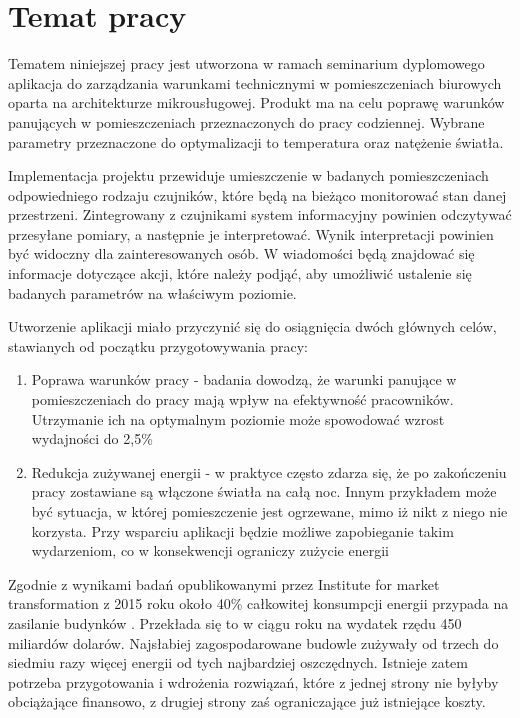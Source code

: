 \newpage %
\section{Temat pracy}

Tematem niniejszej pracy jest utworzona w ramach seminarium dyplomowego aplikacja do 
zarządzania warunkami technicznymi w pomieszczeniach biurowych oparta na architekturze 
mikrousługowej. Produkt ma na celu poprawę warunków panujących w pomieszczeniach 
przeznaczonych do pracy codziennej. Wybrane parametry przeznaczone do optymalizacji to 
temperatura oraz natężenie światła.

Implementacja projektu przewiduje umieszczenie w badanych pomieszczeniach odpowiedniego 
rodzaju czujników, które będą na bieżąco monitorować stan danej przestrzeni. 
Zintegrowany z czujnikami system informacyjny powinien odczytywać przesyłane 
pomiary, a następnie je interpretować. Wynik interpretacji powinien być widoczny dla 
zainteresowanych osób. W wiadomości będą znajdować się informacje dotyczące 
akcji, które należy podjąć, aby umożliwić ustalenie się badanych parametrów na 
właściwym poziomie.

Utworzenie aplikacji miało przyczynić się do osiągnięcia dwóch głównych 
celów, stawianych od początku przygotowywania pracy:

\begin{enumerate}
    \item Poprawa warunków pracy - badania \cite{oseland2012} dowodzą, że 
    warunki panujące w pomieszczeniach do pracy mają wpływ na efektywność pracowników. 
    Utrzymanie ich na optymalnym poziomie może spowodować wzrost wydajności do 2,5\%
    \item Redukcja zużywanej energii - w praktyce często zdarza się, że po zakończeniu 
    pracy zostawiane są włączone światła na całą noc. Innym przykładem może być 
    sytuacja, w której pomieszczenie jest ogrzewane, mimo iż nikt z niego nie korzysta. 
    Przy wsparciu aplikacji będzie możliwe zapobieganie takim wydarzeniom, co w 
    konsekwencji ograniczy zużycie energii
\end{enumerate}

Zgodnie z wynikami badań opublikowanymi przez Institute for market transformation z 
2015 roku około 40\% całkowitej konsumpcji energii przypada na zasilanie budynków 
\cite{Imt.org2015}. Przekłada się to w ciągu roku na wydatek rzędu 450 miliardów 
dolarów. Najsłabiej zagospodarowane budowle zużywały od trzech do siedmiu razy więcej 
energii od tych najbardziej oszczędnych. Istnieje zatem potrzeba przygotowania 
i wdrożenia rozwiązań, które z jednej strony nie byłyby obciążające finansowo, z 
drugiej strony zaś ograniczające już istniejące koszty. 